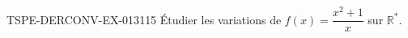 \begin{exercice}{TSPE-DERCONV-EX-013}{1}{15}
Étudier les variations de $f(x) = \dfrac{x^2+1}{x}$ sur $\mathbb{R}^*$.

\end{exercice}
